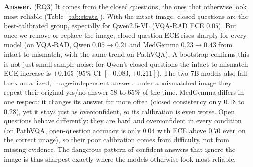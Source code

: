 \documentclass{article}
\newcommand{\rqans}[1]{\smallskip\noindent\textbf{Answer.} #1}
\begin{document}
\rqans{(RQ3) It comes from the closed questions, the ones that otherwise look most
reliable (Table~\ref{tab:strata}). With the intact image, closed questions are the
best-calibrated group, especially for Qwen2.5-VL (VQA-RAD ECE $0.05$). But once we
remove or replace the image, closed-question ECE rises sharply for every model
(on VQA-RAD, Qwen $0.05\!\to\!0.21$ and MedGemma $0.23\!\to\!0.43$ from intact to
mismatch, with the same trend on PathVQA). A bootstrap confirms this is not just
small-sample noise: for Qwen's closed questions the intact-to-mismatch ECE increase
is $+0.165$ ($95\%$ CI $[+0.083, +0.211]$). The two 7B models also fall back on a
fixed, image-independent answer: under a mismatched image they repeat their original
yes/no answer $58$ to $65\%$ of the time. MedGemma differs in one respect: it
changes its answer far more often (closed consistency only $0.18$ to $0.28$), yet it
stays just as overconfident, so its calibration is even worse. Open questions behave
differently: they are hard and overconfident in every condition (on PathVQA,
open-question accuracy is only $0.04$ with ECE above $0.70$ even on the correct
image), so their poor calibration comes from difficulty, not from missing evidence.
The dangerous pattern of confident answers that ignore the image is thus sharpest
exactly where the models otherwise look most reliable.}
\end{document}
